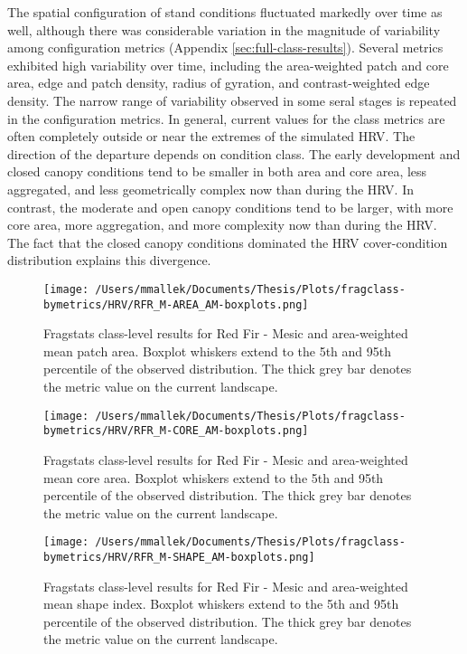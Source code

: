 The spatial configuration of stand conditions fluctuated markedly over time as well, although there was considerable variation in the magnitude of variability among configuration metrics (Appendix \ref{sec:full-class-results}). Several metrics exhibited high variability over time, including the area-weighted patch and core area, edge and patch density, radius of gyration, and contrast-weighted edge density. The narrow range of variability observed in some seral stages is repeated in the configuration metrics. In general, current values for the class metrics are often completely outside or near the extremes of the simulated HRV. The direction of the departure depends on condition class. The early development and closed canopy conditions tend to be smaller in both area and core area, less aggregated, and less geometrically complex now than during the HRV. In contrast, the moderate and open canopy conditions tend to be larger, with more core area, more aggregation, and more complexity now than during the HRV. The fact that the closed canopy conditions dominated the HRV cover-condition distribution explains this divergence.

\begin{figure}[!htbp]
\centering
    \texttt{[image: /Users/mmallek/Documents/Thesis/Plots/fragclass-bymetrics/HRV/RFR\_M-AREA\_AM-boxplots.png]}
  \caption{Fragstats class-level results for Red Fir - Mesic and area-weighted mean patch area. Boxplot whiskers extend to the 5th and 95th percentile of the observed distribution. The thick grey bar denotes the metric value on the current landscape.}
  \label{fig:rfrm_areaam}
\end{figure}


\begin{figure}[!htbp]
\centering
    \texttt{[image: /Users/mmallek/Documents/Thesis/Plots/fragclass-bymetrics/HRV/RFR\_M-CORE\_AM-boxplots.png]}
  \caption{Fragstats class-level results for Red Fir - Mesic and area-weighted mean core area. Boxplot whiskers extend to the 5th and 95th percentile of the observed distribution. The thick grey bar denotes the metric value on the current landscape.}
  \label{fig:rfrm_coream}
\end{figure}


\begin{figure}[!htbp]
\centering
    \texttt{[image: /Users/mmallek/Documents/Thesis/Plots/fragclass-bymetrics/HRV/RFR\_M-SHAPE\_AM-boxplots.png]}
  \caption{Fragstats class-level results for Red Fir - Mesic and area-weighted mean shape index. Boxplot whiskers extend to the 5th and 95th percentile of the observed distribution. The thick grey bar denotes the metric value on the current landscape.}
  \label{fig:rfrm_shapeam}
\end{figure}


